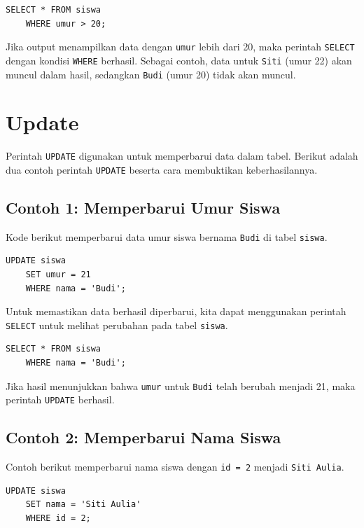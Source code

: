 \begin{lstlisting}[style=sql]
	SELECT * FROM siswa
	WHERE umur > 20;
\end{lstlisting}

Jika output menampilkan data dengan \texttt{umur} lebih dari 20, maka perintah \texttt{SELECT} dengan kondisi \texttt{WHERE} berhasil. Sebagai contoh, data untuk \texttt{Siti} (umur 22) akan muncul dalam hasil, sedangkan \texttt{Budi} (umur 20) tidak akan muncul.

\section{Update}

Perintah \texttt{UPDATE} digunakan untuk memperbarui data dalam tabel. Berikut adalah dua contoh perintah \texttt{UPDATE} beserta cara membuktikan keberhasilannya.

\subsection*{Contoh 1: Memperbarui Umur Siswa}
Kode berikut memperbarui data umur siswa bernama \texttt{Budi} di tabel \texttt{siswa}.

\begin{lstlisting}[style=sql]
	UPDATE siswa
	SET umur = 21
	WHERE nama = 'Budi';
\end{lstlisting}

Untuk memastikan data berhasil diperbarui, kita dapat menggunakan perintah \texttt{SELECT} untuk melihat perubahan pada tabel \texttt{siswa}.

\begin{lstlisting}[style=sql]
	SELECT * FROM siswa
	WHERE nama = 'Budi';
\end{lstlisting}

Jika hasil menunjukkan bahwa \texttt{umur} untuk \texttt{Budi} telah berubah menjadi 21, maka perintah \texttt{UPDATE} berhasil.

\subsection*{Contoh 2: Memperbarui Nama Siswa}
Contoh berikut memperbarui nama siswa dengan \texttt{id = 2} menjadi \texttt{Siti Aulia}.

\begin{lstlisting}[style=sql]
	UPDATE siswa
	SET nama = 'Siti Aulia'
	WHERE id = 2;
\end{lstlisting}

